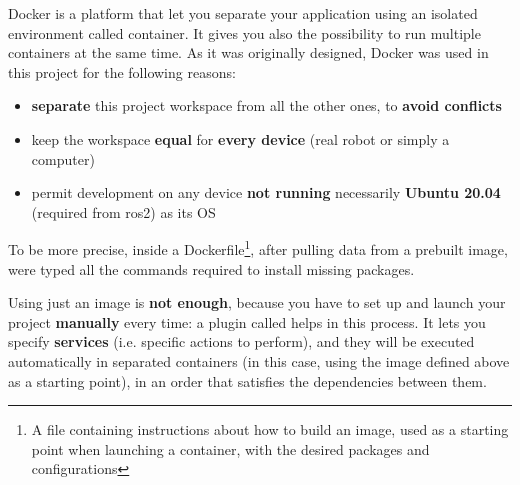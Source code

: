 Docker is a platform that let you separate your application using an isolated environment called container. It gives you also the possibility to run multiple containers at the same time. As it was originally designed, Docker was used in this project for the following reasons: %
  
\begin{itemize}
    \item \textbf{separate} this project workspace from all the other ones, to \textbf{avoid conflicts}
    \item keep the workspace \textbf{equal} for \textbf{every device} (real robot or simply a computer)
    \item permit development on any device \textbf{not running} necessarily \textbf{Ubuntu 20.04} (required from \acrshort{ros}2) as its OS
\end{itemize}

To be more precise, inside a Dockerfile\footnote{A file containing instructions about how to build an image, used as a starting point when launching a container, with the desired packages and configurations}, after pulling data from a prebuilt image\cite{dockerimage}, were typed all the commands required to install missing packages.

Using just an image is \textbf{not enough}, because you have to set up and launch your project \textbf{manually} every time: a plugin called  helps in this process. It lets you specify \textbf{services} (i.e. specific actions to perform), and they will be executed automatically in separated containers (in this case, using the image defined above as a starting point), in an order that satisfies the dependencies between them.
